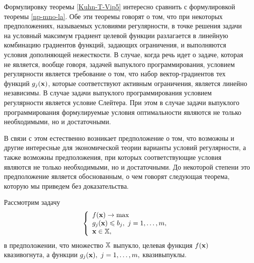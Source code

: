     Формулировку теоремы \ref{Kuhn-T-Vip5} интересно сравнить с
    формулировкой теоремы \ref{np-mno-la}. Обе эти теоремы говорят о
    том, что при некоторых предположениях, называемых  условиями регулярности,
    в точке решения задачи на
    условный максимум градиент целевой функции разлагается в
    линейную комбинацию градиентов функций, задающих ограничения,
    и выполняются условия дополняющей нежесткости. В
    случае, когда речь идет о задаче, которая не является, вообще
    говоря, задачей выпуклого программирования, условием
    регулярности является требование о том, что набор
    вектор-градиентов тех функций $g_{j}(\mathbf{x})$, которые
    соответствуют активным ограничения, является линейно независимы.
    В случае задачи выпуклого программирования условием регулярности
    является условие Слейтера. При этом в случае задачи выпуклого
    программирования формулируемые условия оптимальности являются не
    только необходимыми, но и достаточными.

    В связи с этом естественно возникает предположение о том, что
    возможны и другие интересные для экономической теории варианты условий
    регулярности, а также возможны предположения, при которых
    соответствующие условия являются не только необходимыми, но и
    достаточными. До некоторой степени это предположение является
    обоснованным, о чем говорят следующая теорема, которую
    мы приведем без доказательства.

    Рассмотрим задачу
\begin{equation}\label{problem:ZCVPleq}
    \left\{ \begin{array}{l}
         f(\mathbf{x}) \to \max  \\
        g_j (\mathbf{x}) \leqslant b_j, \ j = 1,\ldots,m,\\
        \mathbf{x} \in \mathbb{X}, \\
  \end{array} \right.
\end{equation}
    в предположении, что множество $\mathbb{X}$ выпукло, целевая функция
    $f(\mathbf{x})$ квазивогнута, а функции $g_j (\mathbf{x}), \ j =
    1,\ldots,m,$ квазивыпуклы.

